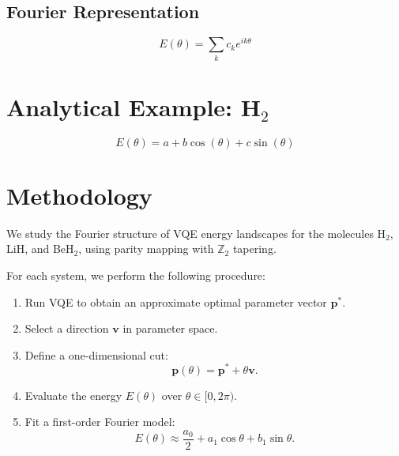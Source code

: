 \documentclass[12pt]{article}
\begin{document}
\subsection{Fourier Representation}

\begin{equation}
E(\theta) = \sum_k c_k e^{ik\theta}
\end{equation}


\section{Analytical Example: H$_2$}


\begin{equation}
E(\theta) = a + b\cos(\theta) + c\sin(\theta)
\end{equation}


\section{Methodology}


We study the Fourier structure of VQE energy landscapes for the molecules H$_2$, LiH, and BeH$_2$, using parity mapping with $\mathbb{Z}_2$ tapering.

For each system, we perform the following procedure:

\begin{enumerate}
    \item Run VQE to obtain an approximate optimal parameter vector $\mathbf{p}^*$.
    \item Select a direction $\mathbf{v}$ in parameter space.
    \item Define a one-dimensional cut:
    \begin{equation}
    \mathbf{p}(\theta) = \mathbf{p}^* + \theta \mathbf{v}.
    \end{equation}
    \item Evaluate the energy $E(\theta)$ over $\theta \in [0, 2\pi)$.
    \item Fit a first-order Fourier model:
    \begin{equation}
    E(\theta) \approx \frac{a_0}{2} + a_1 \cos\theta + b_1 \sin\theta.
    \end{equation}
\end{enumerate}
\end{document}
